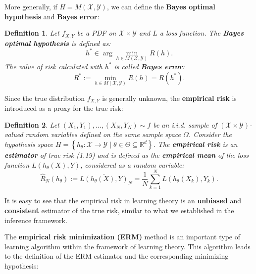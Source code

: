 \documentclass{report}
\newtheorem{definition}{Definition}[chapter]
\begin{document}
More generally, if $H = M(\mathcal{X}, \mathcal{Y})$, we can define the \textbf{Bayes optimal hypothesis} and \textbf{Bayes error}:

\begin{definition}
Let $f_{X,Y}$ be a PDF on $\mathcal{X} \times \mathcal{Y}$ and $L$ a loss function. The \textbf{Bayes optimal hypothesis} is defined as:
\begin{equation}
h^*\in \arg \min_{h \in M(\mathcal{X}, \mathcal{Y})} R(h).
\end{equation}
The value of risk calculated with $h^*$ is called \textbf{Bayes error}:
\begin{equation}
R^* := \min_{h \in M(\mathcal{X}, \mathcal{Y})} R(h) = R(h^*).
\end{equation}
\end{definition}

Since the true distribution $f_{X,Y}$ is generally unknown, the \textbf{empirical risk} is introduced as a proxy for the true risk:

\begin{definition}
Let $(X_1, Y_1),\dots,(X_N, Y_N) \sim f$ be an i.i.d. sample of $(\mathcal{X} \times \mathcal{Y})$-valued random variables defined on the same sample space $\Omega$. Consider the hypothesis space $H=\left\{h_\theta : \mathcal{X} \to \mathcal{Y} \mid\theta\in\Theta\subseteq\mathbb{R}^d\right\}$. The \textbf{empirical risk} is an \textbf{estimator} of true risk (1.19) and is defined as the \textbf{empirical mean} of the loss function $L(h_\theta(X), Y)$, considered as a random variable:
\begin{equation}
\hat{R}_N(h_\theta) := \overline{L(h_\theta(X),Y)}_N = \frac{1}{N}\sum_{k=1}^{N}L(h_\theta(X_k),Y_k).
\end{equation}
\end{definition}

It is easy to see that the empirical risk in learning theory is an \textbf{unbiased} and \textbf{consistent} estimator of the true risk, similar to what we established in the inference framework.

The \textbf{empirical risk minimization (ERM)} method is an important type of learning algorithm within the framework of learning theory. This algorithm leads to the definition of the ERM estimator and the corresponding minimizing hypothesis:
\end{document}
